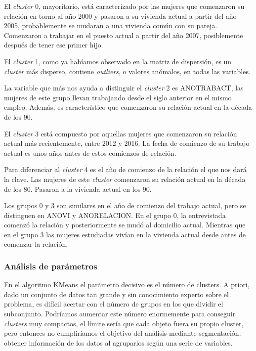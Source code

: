 \documentclass[a4paper, 20pt]{article}
\begin{document}
El \textit{cluster} 0, mayoritario, está caracterizado por las mujeres que comenzaron su relación en torno al año 2000 y pasaron a su vivienda actual a partir del año 2005, probablemente se mudaran a una vivienda común con su pareja. Comenzaron a trabajar en el puesto actual a partir del año 2007, posiblemente después de tener ese primer hijo.

El \textit{cluster} 1, como ya habíamos observado en la matriz de dispersión, es un \textit{cluster} más disperso, contiene \textit{outliers}, o valores anómalos, en todas las variables.

La variable que más nos ayuda a distinguir el \textit{cluster} 2 es ANOTRABACT, las mujeres de este grupo llevan trabajando desde el siglo anterior en el mismo empleo. Además, es característico que comenzaron su relación actual en la década de los 90.

El \textit{cluster} 3 está compuesto por aquellas mujeres que comenzaron su relación actual más recientemente, entre 2012 y 2016. La fecha de comienzo de su trabajo actual es unos años antes de estos comienzos de relación. 

Para diferenciar al \textit{cluster} 4 es el año de comienzo de la relación el que nos dará la clave. Las mujeres de este \textit{cluster} comenzaron su relación actual en la década de los 80. Pasaron a la vivienda actual en los 90.

Los grupos 0 y 3 son similares en el año de comienzo del trabajo actual, pero se distinguen en ANOVI y ANORELACION. En el grupo 0, la entrevistada comenzó la relación y posteriormente se mudó al domicilio actual. Mientras que en el grupo 3 las mujeres estudiadas vivían en la vivienda actual desde antes de comenzar la relación.


\subsubsection{Análisis de parámetros}

En el algoritmo KMeans el parámetro decisivo es el número de clusters. A priori, dado un conjunto de datos tan grande y sin conocimiento experto sobre el problema, es difícil acertar con el número de grupos en los que dividir el subconjunto. Podríamos aumentar este número enormemente para conseguir \textit{clusters} muy compactos, el límite sería que cada objeto fuera su propio cluster, pero entonces no cumpliríamos el objetivo del análisis mediante segmentación: obtener información de los datos al agruparlos según una serie de variables.
\end{document}
